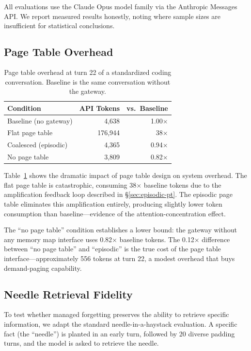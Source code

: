 \documentclass[sigplan,screen,anonymous]{acmart}
\begin{document}
All evaluations use the Claude Opus model family via the Anthropic
Messages API. We report measured results honestly, noting where sample
sizes are insufficient for statistical conclusions.

\subsection{Page Table Overhead}
\label{sec:pt-eval}

\begin{table}[t]
\centering
\caption{Page table overhead at turn 22 of a standardized coding
  conversation. Baseline is the same conversation without the
  gateway.}
\label{tab:pt-overhead}
\begin{tabular}{lrr}
\toprule
Condition & API Tokens & vs.\ Baseline \\
\midrule
Baseline (no gateway)    & 4,638   & 1.00$\times$ \\
Flat page table          & 176,944 & 38$\times$ \\
Coalesced (episodic)     & 4,365   & 0.94$\times$ \\
No page table            & 3,809   & 0.82$\times$ \\
\bottomrule
\end{tabular}
\end{table}

Table~\ref{tab:pt-overhead} shows the dramatic impact of page table
design on system overhead. The flat page table is catastrophic,
consuming 38$\times$ baseline tokens due to the amplification feedback
loop described in \S\ref{sec:episodic-pt}. The episodic page table
eliminates this amplification entirely, producing slightly lower token
consumption than baseline---evidence of the attention-concentration
effect.

The ``no page table'' condition establishes a lower bound: the gateway
without any memory map interface uses 0.82$\times$ baseline tokens.
The 0.12$\times$ difference between ``no page table'' and ``episodic''
is the true cost of the page table interface---approximately 556
tokens at turn 22, a modest overhead that buys demand-paging
capability.

\subsection{Needle Retrieval Fidelity}

To test whether managed forgetting preserves the ability to retrieve
specific information, we adapt the standard needle-in-a-haystack
evaluation. A specific fact (the ``needle'') is planted in an early
turn, followed by 20 diverse padding turns, and the model is asked to
retrieve the needle.
\end{document}
